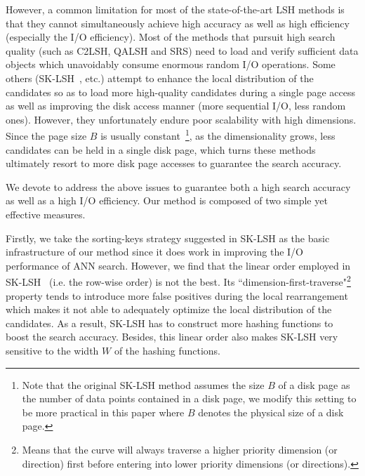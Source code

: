 \documentclass[twocolumn]{svjour3}          %
\begin{document}
However, a common limitation for most of the state-of-the-art LSH methods is that they cannot simultaneously achieve high accuracy as well as high efficiency (especially the I/O efficiency).
Most of the methods that pursuit high search quality (such as C2LSH, QALSH and SRS) need to load and verify sufficient data objects which unavoidably consume enormous random I/O operations.
Some others (SK-LSH~\cite{Liu2014SKLSH}, etc.) attempt to enhance the local distribution of the candidates so as to load more high-quality candidates during a single page access as well as improving the disk access manner (more sequential I/O, less random ones). However, they unfortunately endure poor scalability with high dimensions. Since the page size $B$ is usually constant~\footnote{Note that the original SK-LSH method assumes the size $B$ of a disk page as the number of data points contained in a disk page, we modify this setting to be more practical in this paper where $B$ denotes the physical size of a disk page.}, as the dimensionality grows, less candidates can be held in a single disk page, which turns these methods ultimately resort to more disk page accesses to guarantee the search accuracy.

We devote to address the above issues to guarantee both a high search accuracy as well as a high I/O efficiency. Our method is composed of two simple yet effective measures.

Firstly, we take the sorting-keys strategy suggested in SK-LSH as the basic infrastructure of our method since it does work in improving the I/O performance of ANN search.
However, we find that the linear order employed in SK-LSH~\cite{Liu2014SKLSH} (i.e. the row-wise order) is not the best. Its ``dimension-first-traverse"\footnote{Means that the curve will always traverse a higher priority dimension (or direction) first before entering into lower priority dimensions (or directions).} property tends to introduce more false positives during the local rearrangement which makes it not able to adequately optimize the local distribution of the candidates. As a result, SK-LSH has to construct more hashing functions to boost the search accuracy. Besides, this linear order also makes SK-LSH very sensitive to the width $W$ of the hashing functions.
\end{document}
